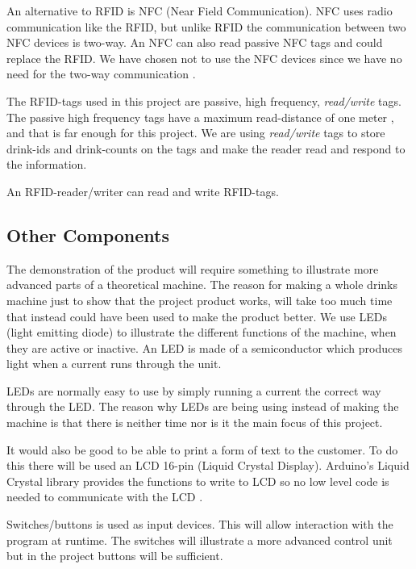 An alternative to RFID is NFC (Near Field Communication). NFC uses radio communication like the RFID, but unlike RFID the communication between two NFC devices is two-way. An NFC can also read passive NFC tags and could replace the RFID. We have chosen not to use the NFC devices since we have no need for the two-way communication \citep{NFC}.

The RFID-tags used in this project are passive, high frequency, \textit{read/write} tags. The passive high frequency tags have a maximum read-distance of one meter \citep{RFID}, and that is far enough for this project. We are using \textit{read/write} tags to store drink-ids and drink-counts on the tags and make the reader read and respond to the information.

An RFID-reader/writer can read and write RFID-tags. 

\subsection{Other Components}
The demonstration of the product will require something to illustrate more advanced parts of a theoretical machine.
The reason for making a whole drinks machine just to show that the project product works, will take too much time that instead could have been used to make the product better. 
We use LEDs (light emitting diode) to illustrate the different functions of the machine, when they are active or inactive. An LED is made of a semiconductor which produces light when a current runs through the unit.

LEDs are normally easy to use by simply running a current the correct way through the LED.
The reason why LEDs are being using instead of making the machine is that there is neither time nor is it the main focus of this project.

It would also be good to be able to print a form of text to the customer. To do this there will be used an LCD 16-pin (Liquid Crystal Display). Arduino's Liquid Crystal library provides the functions to write to LCD so no low level code is needed to communicate with the LCD \citep{ArduinoLCD}.

Switches/buttons is used as input devices. This will allow interaction with the program at runtime. The switches will illustrate a more advanced control unit but in the project buttons will be sufficient.